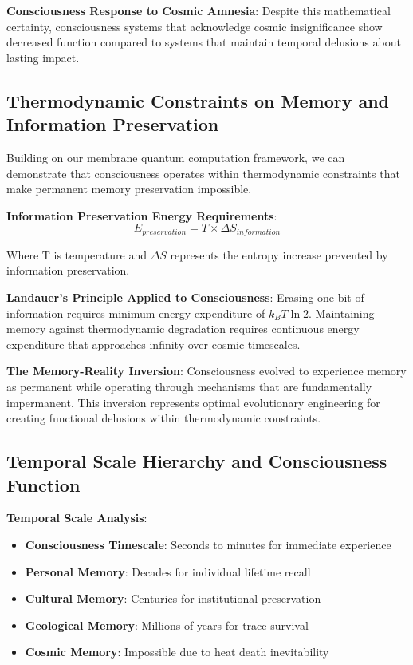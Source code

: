 \documentclass[12pt]{article}
\begin{document}
\textbf{Consciousness Response to Cosmic Amnesia}: Despite this mathematical certainty, consciousness systems that acknowledge cosmic insignificance show decreased function compared to systems that maintain temporal delusions about lasting impact.

\subsection{Thermodynamic Constraints on Memory and Information Preservation}

Building on our membrane quantum computation framework, we can demonstrate that consciousness operates within thermodynamic constraints that make permanent memory preservation impossible.

\textbf{Information Preservation Energy Requirements}:
$$E_{preservation} = T \times \Delta S_{information}$$

Where T is temperature and $\Delta S$ represents the entropy increase prevented by information preservation.

\textbf{Landauer's Principle Applied to Consciousness}: Erasing one bit of information requires minimum energy expenditure of $k_B T \ln 2$. Maintaining memory against thermodynamic degradation requires continuous energy expenditure that approaches infinity over cosmic timescales.

\textbf{The Memory-Reality Inversion}: Consciousness evolved to experience memory as permanent while operating through mechanisms that are fundamentally impermanent. This inversion represents optimal evolutionary engineering for creating functional delusions within thermodynamic constraints.

\subsection{Temporal Scale Hierarchy and Consciousness Function}

\textbf{Temporal Scale Analysis}:
\begin{itemize}
\item \textbf{Consciousness Timescale}: Seconds to minutes for immediate experience
\item \textbf{Personal Memory}: Decades for individual lifetime recall
\item \textbf{Cultural Memory}: Centuries for institutional preservation
\item \textbf{Geological Memory}: Millions of years for trace survival
\item \textbf{Cosmic Memory}: Impossible due to heat death inevitability
\end{itemize}
\end{document}

